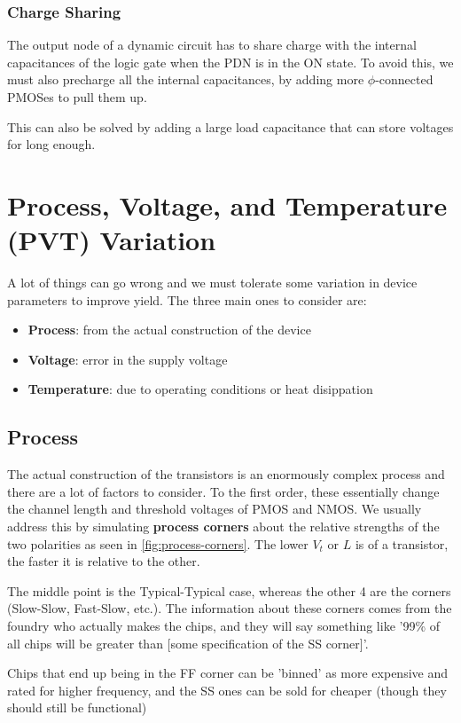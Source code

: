 \documentclass[11pt]{report}
\begin{document}
\subsubsection{Charge Sharing}
The output node of a dynamic circuit has to share charge with the internal capacitances of the logic gate when the PDN is in the ON state. To avoid this, we must also precharge all the internal capacitances, by adding more $\phi$-connected PMOSes to pull them up.

This can also be solved by adding a large load capacitance that can store voltages for long enough.

\section{Process, Voltage, and Temperature (PVT) Variation}
A lot of things can go wrong and we must tolerate some variation in device parameters to improve yield. The three main ones to consider are:

\begin{itemize}
	\item \textbf{Process}: from the actual construction of the device
	\item \textbf{Voltage}: error in the supply voltage
	\item \textbf{Temperature}: due to operating conditions or heat disippation
\end{itemize}


\subsection{Process}
The actual construction of the transistors is an enormously complex process and there are a lot of factors to consider. To the first order, these essentially change the channel length and threshold voltages of PMOS and NMOS. We usually address this by simulating \textbf{process corners} about the relative strengths of the two polarities as seen in \autoref{fig:process-corners}. The lower $V_t$ or $L$ is of a transistor, the faster it is relative to the other.

The middle point is the Typical-Typical case, whereas the other 4 are the corners (Slow-Slow, Fast-Slow, etc.). The information about these corners comes from the foundry who actually makes the chips, and they will say something like '99\% of all chips will be greater than [some specification of the SS corner]'.

Chips that end up being in the FF corner can be 'binned' as more expensive and rated for higher frequency, and the SS ones can be sold for cheaper (though they should still be functional)
\end{document}
